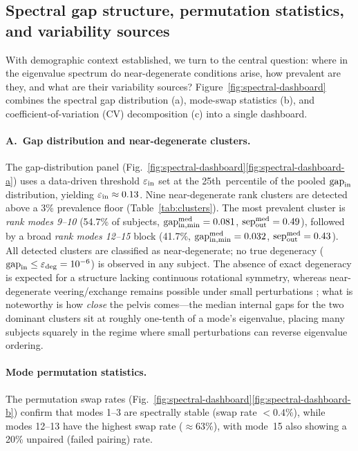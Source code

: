 \documentclass[11pt]{article}
\begin{document}
\subsection{Spectral gap structure, permutation statistics, and variability sources}
\label{sec:spectral-gaps-results}

With demographic context established, we turn to the central question: where in the eigenvalue spectrum do near-degenerate conditions arise, how prevalent are they, and what are their variability sources?
Figure~\ref{fig:spectral-dashboard} combines the spectral gap distribution (a), mode-swap statistics (b), and coefficient-of-variation (CV) decomposition (c) into a single dashboard.

\paragraph{A.\ Gap distribution and near-degenerate clusters.}
The gap-distribution panel (Fig.~\ref{fig:spectral-dashboard}\ref{fig:spectral-dashboard-a}) uses a data-driven threshold $\varepsilon_{\rm in}$ set at the 25th~percentile of the pooled $\mathrm{gap}_{\rm in}$ distribution, yielding $\varepsilon_{\rm in} \approx 0.13$.
Nine near-degenerate rank clusters are detected above a 3\% prevalence floor (Table~\ref{tab:clusters}).
The most prevalent cluster is \emph{rank modes 9--10} (54.7\% of subjects, $\mathrm{gap}_{\rm in,\min}^{\rm med} = 0.081$, $\mathrm{sep}_{\rm out}^{\rm med} = 0.49$), followed by a broad \emph{rank modes 12--15} block (41.7\%, $\mathrm{gap}_{\rm in,\min}^{\rm med} = 0.032$, $\mathrm{sep}_{\rm out}^{\rm med} = 0.43$).
All detected clusters are classified as near-degenerate; no true degeneracy ($\mathrm{gap}_{\rm in} \le \varepsilon_{\rm deg} = 10^{-6}$) is observed in any subject.
The absence of exact degeneracy is expected for a structure lacking continuous rotational symmetry, whereas near-degenerate veering/exchange remains possible under small perturbations \citep{Pierre1988,Chen2019Veering}; what is noteworthy is how \emph{close} the pelvis comes---the median internal gaps for the two dominant clusters sit at roughly one-tenth of a mode's eigenvalue, placing many subjects squarely in the regime where small perturbations can reverse eigenvalue ordering.

\paragraph{Mode permutation statistics.}
The permutation swap rates (Fig.~\ref{fig:spectral-dashboard}\ref{fig:spectral-dashboard-b}) confirm that modes 1--3 are spectrally stable (swap rate $< 0.4\%$), while modes 12--13 have the highest swap rate ($\approx 63\%$), with mode~15 also showing a 20\% unpaired (failed pairing) rate.
\end{document}
